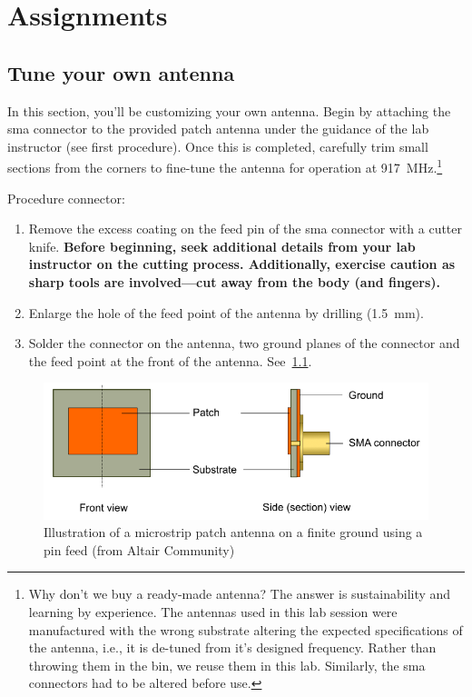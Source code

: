 \chapter{Assignments}\label{ch:assignments}

\section{Tune your own antenna}
In this section, you'll be customizing your own antenna. Begin by attaching the \gls{sma} connector to the provided patch antenna under the guidance of the lab instructor (see first procedure). Once this is completed, carefully trim small sections from the corners to fine-tune the antenna for operation at \SI{917}{\mega\hertz}.\footnote{Why don't we buy a ready-made antenna? The answer is sustainability and learning by experience. The antennas used in this lab session were manufactured with the wrong substrate altering the expected specifications of the antenna, i.e., it is de-tuned from it's designed frequency. Rather than throwing them in the bin, we reuse them in this lab. Similarly, the \gls{sma} connectors had to be altered before use.}

Procedure connector:
\begin{enumerate}
    \item Remove the excess coating on the feed pin of the \gls{sma} connector with a cutter knife. \textbf{Before beginning, seek additional details from your lab instructor on the cutting process. Additionally, exercise caution as sharp tools are involved—cut away from the body (and fingers).}
    \item Enlarge the hole of the feed point of the antenna by drilling (\SI{1.5}{mm}).
    \item Solder the connector on the antenna, two ground planes of the connector and the feed point at the front of the antenna. See~\cref{fig:patch}.
\end{enumerate}

\begin{figure}[hbtp]
    \centering
    \includegraphics[width=0.8\linewidth]{figs/patch_microstrip_pin_fed.png}
    \caption{Illustration of a microstrip patch antenna on a finite ground using a pin feed (from Altair Community)}\label{fig:patch}
\end{figure}

